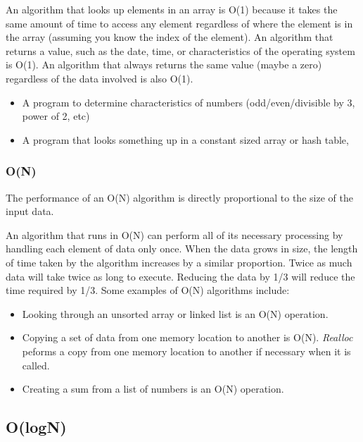An algorithm that looks up elements in an array is O(1) because it takes
the same amount of time to access any element regardless of where the
element is in the array (assuming you know the index of the element).
An algorithm that returns a value, such as the date, time, or
characteristics of the operating system is O(1). An algorithm that
always returns the same value (maybe a zero) regardless of the data
involved is also O(1).



\begin{itemize}
\item
  A program to determine characteristics of numbers (odd/even/divisible
  by 3, power of 2, etc)
\item
  A program that looks something up in a constant sized array or hash
  table,
\end{itemize}



\subsubsection{O(N)}

The performance of an O(N) algorithm  is directly
proportional to the size of the input data.

An algorithm that runs in O(N) can perform all of its necessary
processing by handling each element of data only once.  When the data
grows in size, the length of time taken by the algorithm increases by a
similar proportion.  Twice as much data will take twice as long to execute.  Reducing the data by 1/3 will reduce the time required by 1/3.
Some examples of O(N) algorithms include:

\begin{itemize}
\item
  \textbf{} Looking through an unsorted array or linked list is an O(N)
  operation.
\item
  Copying a set of data  from one memory location to another is O(N).  \textit{Realloc} peforms a copy from one memory location to another if necessary when it is called.
\item
  Creating a sum from a list of numbers is an O(N) operation.
\end{itemize}



\subsection{O(logN)}

